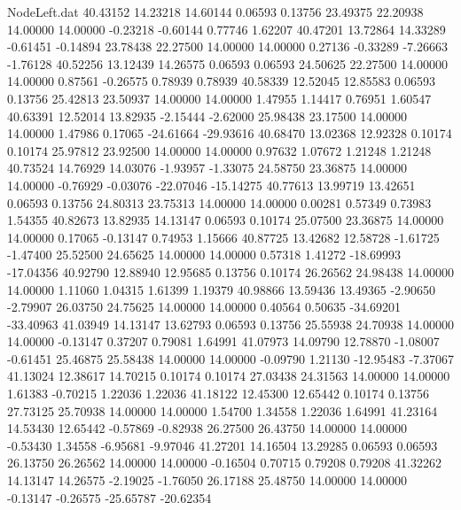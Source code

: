 \begin{filecontents}{NodeLeft.dat}
  40.43152   14.23218   14.60144     0.06593    0.13756   23.49375   22.20938   14.00000   14.00000   -0.23218   -0.60144    0.77746    1.62207
  40.47201   13.72864   14.33289    -0.61451   -0.14894   23.78438   22.27500   14.00000   14.00000    0.27136   -0.33289   -7.26663   -1.76128
  40.52256   13.12439   14.26575     0.06593    0.06593   24.50625   22.27500   14.00000   14.00000    0.87561   -0.26575    0.78939    0.78939
  40.58339   12.52045   12.85583     0.06593    0.13756   25.42813   23.50937   14.00000   14.00000    1.47955    1.14417    0.76951    1.60547
  40.63391   12.52014   13.82935    -2.15444   -2.62000   25.98438   23.17500   14.00000   14.00000    1.47986    0.17065  -24.61664  -29.93616
  40.68470   13.02368   12.92328     0.10174    0.10174   25.97812   23.92500   14.00000   14.00000    0.97632    1.07672    1.21248    1.21248
  40.73524   14.76929   14.03076    -1.93957   -1.33075   24.58750   23.36875   14.00000   14.00000   -0.76929   -0.03076  -22.07046  -15.14275
  40.77613   13.99719   13.42651     0.06593    0.13756   24.80313   23.75313   14.00000   14.00000    0.00281    0.57349    0.73983    1.54355
  40.82673   13.82935   14.13147     0.06593    0.10174   25.07500   23.36875   14.00000   14.00000    0.17065   -0.13147    0.74953    1.15666
  40.87725   13.42682   12.58728    -1.61725   -1.47400   25.52500   24.65625   14.00000   14.00000    0.57318    1.41272  -18.69993  -17.04356
  40.92790   12.88940   12.95685     0.13756    0.10174   26.26562   24.98438   14.00000   14.00000    1.11060    1.04315    1.61399    1.19379
  40.98866   13.59436   13.49365    -2.90650   -2.79907   26.03750   24.75625   14.00000   14.00000    0.40564    0.50635  -34.69201  -33.40963
  41.03949   14.13147   13.62793     0.06593    0.13756   25.55938   24.70938   14.00000   14.00000   -0.13147    0.37207    0.79081    1.64991
  41.07973   14.09790   12.78870    -1.08007   -0.61451   25.46875   25.58438   14.00000   14.00000   -0.09790    1.21130  -12.95483   -7.37067
  41.13024   12.38617   14.70215     0.10174    0.10174   27.03438   24.31563   14.00000   14.00000    1.61383   -0.70215    1.22036    1.22036
  41.18122   12.45300   12.65442     0.10174    0.13756   27.73125   25.70938   14.00000   14.00000    1.54700    1.34558    1.22036    1.64991
  41.23164   14.53430   12.65442    -0.57869   -0.82938   26.27500   26.43750   14.00000   14.00000   -0.53430    1.34558   -6.95681   -9.97046
  41.27201   14.16504   13.29285     0.06593    0.06593   26.13750   26.26562   14.00000   14.00000   -0.16504    0.70715    0.79208    0.79208
  41.32262   14.13147   14.26575    -2.19025   -1.76050   26.17188   25.48750   14.00000   14.00000   -0.13147   -0.26575  -25.65787  -20.62354

\end{filecontents}
